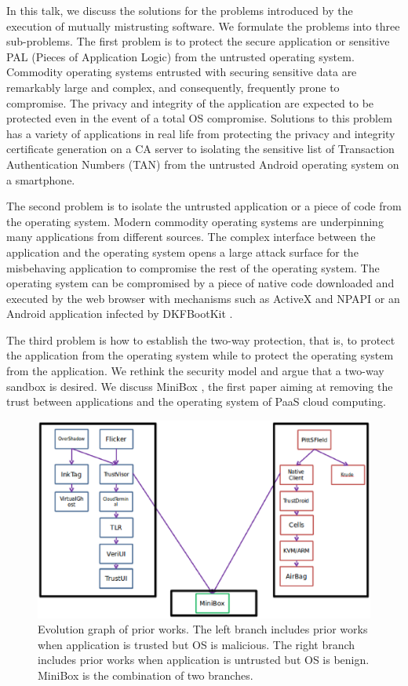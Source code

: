 In this talk, we discuss the solutions for the problems introduced by the
execution of mutually mistrusting software. We formulate the problems into three
sub-problems. The first problem is to protect the secure application or
sensitive PAL (Pieces of Application Logic) from the untrusted operating system.
Commodity operating systems entrusted with securing sensitive data are
remarkably large and complex, and consequently, frequently prone to compromise.
The privacy and integrity of the application are expected to be protected even
in the event of a total OS compromise. Solutions to this problem has a variety
of applications in real life from protecting the privacy and integrity
certificate generation on a CA server to isolating the sensitive list of
Transaction Authentication Numbers (TAN) from the untrusted Android operating
system on a smartphone.

The second problem is to isolate the untrusted application or a piece of code
from the operating system. Modern commodity operating systems are underpinning
many applications from different sources. The complex interface between the
application and the operating system opens a large attack surface for the
misbehaving application to compromise the rest of the operating system. The
operating system can be compromised by a piece of native code downloaded and
executed by the web browser with mechanisms such as ActiveX and NPAPI or an
Android application infected by DKFBootKit \cite{DKFBootKit}.

The third problem is how to establish the two-way protection, that is, to
protect the application from the operating system while to protect the operating
system from the application. We rethink the security model and argue that a
two-way sandbox is desired.  We discuss MiniBox \cite{MiniBox}, the first paper
aiming at removing the trust between applications and the operating system of
PaaS cloud computing.

\begin{figure}[htb]
\centering
\includegraphics[width=\columnwidth]{figures/evolution.eps}
\caption{Evolution graph of prior works. The left branch includes prior works
when application is trusted but OS is malicious. The right branch includes prior
works when application is untrusted but OS is benign. MiniBox is the combination
of two branches.}
\label{fig:evolution}
\end{figure}

